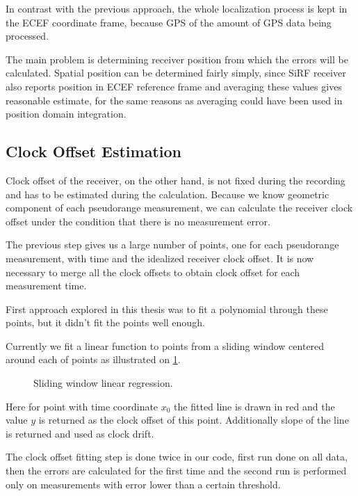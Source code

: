 In contrast with the previous approach, the whole localization process is kept in
the ECEF coordinate frame, because GPS of the amount of GPS data being processed.

The main problem is determining receiver position from which the errors will be
calculated.
Spatial position can be determined fairly simply, since SiRF receiver also
reports position in ECEF reference frame and averaging these values gives
reasonable estimate, for the same reasons as averaging could have been used in
position domain integration.

\subsection{Clock Offset Estimation}
Clock offset of the receiver, on the other hand, is not fixed during the recording
and has to be estimated during the calculation.
Because we know geometric component of each pseudorange measurement, we can
calculate the receiver clock offset under the condition that there is no measurement
error.

The previous step gives us a large number of points, one for each pseudorange
measurement, with time and the idealized receiver clock offset.
It is now necessary to merge all the clock offsets to obtain clock offset for
each measurement time.

First approach explored in this thesis was to fit a polynomial through these
points, but it didn't fit the points well enough.

Currently we fit a linear function to points from a sliding window centered
around each of points as illustrated on \cref{fig:sliding-window-linear-regression}.

\begin{figure}[h]
	\centering
	
	\caption{Sliding window linear regression.}
	\label{fig:sliding-window-linear-regression}
\end{figure}

Here for point with time coordinate \(x_0\) the fitted line is drawn in red
and the value \(y\) is returned as the clock offset of this point.
Additionally slope of the line is returned and used as clock drift.

The clock offset fitting step is done twice in our code, first run done on
all data, then the errors are calculated for the first time and the second run
is performed only on measurements with error lower than a certain threshold.

